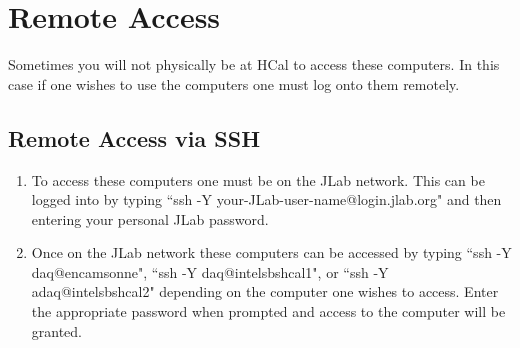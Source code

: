 \documentclass[oneside]{book}   %
\begin{document}
\section{Remote Access}
\label{sec:remote}

Sometimes you will not physically be at HCal to access these computers. In this case if one wishes to use the computers one must log onto them remotely.\\

\subsection{Remote Access via SSH}
\label{sec:remote_ssh}
\begin{enumerate}
	\item To access these computers one must be on the JLab network. This can be logged into by typing ``ssh -Y your-JLab-user-name@login.jlab.org" and then entering your personal JLab password. 
	\item Once on the JLab network these computers can be accessed by typing ``ssh -Y daq@encamsonne", ``ssh -Y  daq@intelsbshcal1", or ``ssh -Y  adaq@intelsbshcal2" depending on the computer one wishes to access. Enter the appropriate password when prompted and access to the computer will be granted.
\end{enumerate}
\end{document}
